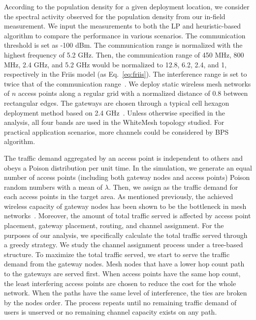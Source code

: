 According to the population density for a given deployment location, we consider the spectral activity observed for 
the population density from our in-field measurement.
We input the measurements to both the LP and heuristic-based algorithm to compare 
the performance in various scenarios. The communication threshold is set as -100 dBm. The 
communication range is normalized with the highest frequency of 5.2 GHz. Then, the communication 
range of 450 MHz, 800 MHz, 2.4 GHz, and 5.2 GHz would be normalized to 12.8, 6.2, 2.4, and 1, 
respectively in the Friis model (as Eq.~\ref{eq:friis}). 
The interference range is set to twice that of the communication range~\cite{raniwala2005architecture}. 
We deploy static wireless mesh networks of $n$ access points along a regular grid with a normalized 
distance of 0.8 between rectangular edges. The gateways are chosen through a typical cell hexagon 
deployment method based on 2.4 GHz~\cite{meguerdichian2001exposure}. Unless otherwise specified 
in the analysis, all four bands are used in the WhiteMesh topology studied. For practical application 
scenarios, more channels could be considered by BPS algorithm.


The traffic demand aggregated by an access point is independent to others and obeys a Poison distribution
per unit time. 
In the simulation, we generate an equal number of access points (including both gateway nodes and 
access points) Poison random numbers with a mean of $\lambda$. 
Then, we assign as the traffic demand for each access points in the 
target area.
As mentioned previously, the achieved wireless capacity of gateway nodes has been shown to be the 
bottleneck in mesh networks~\cite{robinson2010deploying}. Moreover, the amount of total traffic served is affected 
by access point placement, gateway placement, routing, and channel assignment. For the purposes 
of our analysis, we specifically calculate the total traffic served through a greedy strategy. 
We study the channel assignment process under a tree-based structure. 
To maximize the total traffic served, we start to serve the traffic demand from the gateway nodes. 
Mesh nodes that have a lower hop count path to the gateways are served first. 
When access points have the same hop count, the least interfering access points are chosen to 
reduce the cost for the whole network. When the paths have the same level of interference, the ties 
are broken by the nodes order.
The process repeats until no remaining traffic demand of users 
is unserved or no remaining channel capacity exists on any path.

